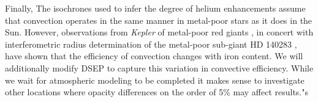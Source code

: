 Finally, The isochrones used to infer the degree of helium enhancements assume
that convection operates in the same manner in metal-poor stars as it does in
the Sun. However, observations from \textit{Kepler} of metal-poor red giants
\citep{Bonaca2012, tayar2017correlation}, in concert with interferometric
radius determination of the metal-poor sub-giant HD 140283
\citep{creevey2015benchmark}, have shown that the efficiency of convection
changes with iron content. We will additionally modify DSEP to capture this
variation in convective efficiency. While we wait for atmospheric modeling to
be completed it makes sense to investigate other locations where opacity
differences on the order of 5\% may affect results."s
